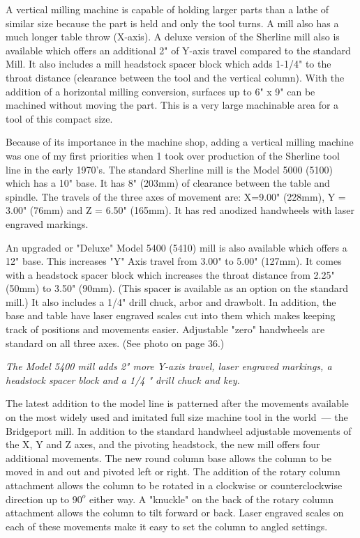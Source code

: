 
A vertical milling machine is capable of holding larger parts than a lathe of
similar size because the part is held and only the tool turns. A mill also has a
much longer table throw (X-axis). A deluxe version of the Sherline mill also is
available which offers an additional 2" of Y-axis travel compared to the
standard Mill. It also includes a mill headstock spacer block which adds 1-1/4"
to the throat distance (clearance between the tool and the vertical column).
With the addition of a horizontal milling conversion, surfaces up to 6" x 9" can
be machined without moving the part. This is a very large machinable area for a
tool of this compact size.

Because of its importance in the machine shop, adding a vertical milling machine
was one of my first priorities when 1 took over production of the Sherline tool
line in the early 1970's. The standard Sherline mill is the Model 5000 (5100)
which has a 10" base. It has 8" (203mm) of clearance between the table and
spindle. The travels of the three axes of movement are: X=9.00" (228mm), Y =
3.00" (76mm) and Z = 6.50" (165mm). It has red anodized handwheels with laser
engraved markings.


An upgraded or "Deluxe" Model 5400 (5410) mill is also available which offers a
12" base. This increases "Y" Axis travel from 3.00" to 5.00" (127mm). It comes
with a headstock spacer block which increases the throat distance from 2.25"
(50mm) to 3.50" (90mm). (This spacer is available as an option on the standard
mill.) It also includes a 1/4" drill chuck, arbor and drawbolt. In addition, the
base and table have laser engraved scales cut into them which makes keeping
track of positions and movements easier. Adjustable "zero" handwheels are
standard on all three axes. (See photo on page 36.)

\bigskip
\textit{The Model 5400 mill adds 2" more Y-axis travel, laser engraved markings,
a headstock spacer block and a 1/4 " drill chuck and key.}
\bigskip

 
The latest addition to the model line is patterned after the movements available
on the most widely used and imitated full size machine tool in the world\ ---
the Bridgeport mill. In addition to the standard handwheel adjustable movements
of the X, Y and Z axes, and the pivoting headstock, the new mill offers four
additional movements. The new round column base allows the column to be moved in
and out and pivoted left or right. The addition of the rotary column attachment
allows the column to be rotated in a clockwise or counterclockwise direction up
to $90^{o}$ either way. A "knuckle" on the back of the rotary column
attachment allows the column to tilt forward or back. Laser engraved scales on each of
these movements make it easy to set the column to angled settings.

